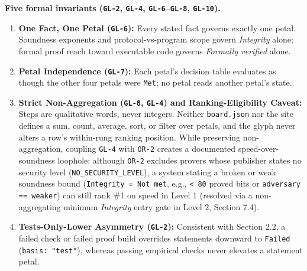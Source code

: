 \documentclass[11pt,letterpaper]{article}
\begin{document}
\textbf{Five formal invariants (\texttt{GL-2}, \texttt{GL-4}, \texttt{GL-6}--\texttt{GL-8}, \texttt{GL-10}).}

\begin{enumerate}
\item \textbf{One Fact, One Petal (\texttt{GL-6}):} Every stated fact governs exactly one petal. Soundness exponents and protocol-vs-program scope govern \textit{Integrity} alone; formal proof reach toward executable code governs \textit{Formally verified} alone.
\item \textbf{Petal Independence (\texttt{GL-7}):} Each petal's decision table evaluates as though the other four petals were \texttt{Met}; no petal reads another petal's state.
\item \textbf{Strict Non-Aggregation (\texttt{GL-8}, \texttt{GL-4}) and Ranking-Eligibility Caveat:} Steps are qualitative words, never integers. Neither \texttt{board.\allowbreak{}json} nor the site defines a sum, count, average, sort, or filter over petals, and the glyph never alters a row's within-rung ranking position. While preserving non-aggregation, coupling \texttt{GL-4} with \texttt{OR-2} creates a documented speed-over-soundness loophole: although \texttt{OR-2} excludes provers whose publisher states no security level (\texttt{NO\_\allowbreak{}SECURITY\_\allowbreak{}LEVEL}), a system stating a broken or weak soundness bound (\texttt{Integrity = Not met}, e.g., \texttt{< 80} proved bits or \texttt{adversary == weaker}) can still rank \#1 on speed in Level 1 (resolved via a non-aggregating minimum \textit{Integrity} entry gate in Level 2, Section 7.4).
\item \textbf{Tests-Only-Lower Asymmetry (\texttt{GL-2}):} Consistent with Section 2.2, a failed check or failed proof build overrides statements downward to \texttt{Failed} (\texttt{basis: "test"}), whereas passing empirical checks never elevates a statement petal.

\end{enumerate}
\end{document}
